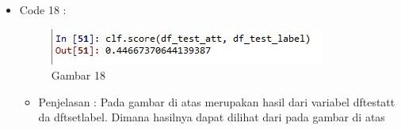 \begin{enumerate}
\begin{itemize}
\begin{itemize}
\end{itemize}
\item Code  18 :
\par
\begin{figure}[ht]
\centering
\includegraphics[scale=0.7]{figures/pd18.jpg}
\caption{Gambar 18}
\label{contoh}
\end{figure}
\par
\begin{itemize}
\item Penjelasan : Pada gambar di atas merupakan hasil dari variabel dftestatt da dftsetlabel. Dimana hasilnya dapat dilihat dari pada gambar di atas
\par
\par
\end{itemize}

\end{itemize}



\end{enumerate}
